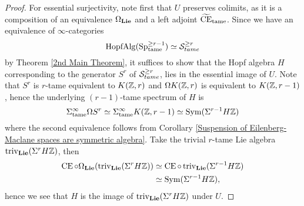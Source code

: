 \begin{proof}

	
	

    For essential surjectivity, note first that  $U$ preserves colimits, as it is a composition of an equivalence $\Omega_{\mathbf{Lie}}$ and a left adjoint $\widetilde{\operatorname{CE}}_{\operatorname{\operatorname{tame}}}$. 
    Since we have an equivalence of $\infty$-categories 
    $$\operatorname{HopfAlg}(\operatorname{Sp}^{\geq r-1}_{\operatorname{\operatorname{tame}}})
    \simeq
    {\mathcal{S}}^{\geq r}_{tame}
    $$  by Theorem \ref{2nd Main Theorem},
    it suffices to show that the Hopf algebra $H$ corresponding to the generator $S^r$ of ${\mathcal{S}}^{\geq r}_{tame}$, lies in the essential image of $U$. 
    Note that $S^{r}$ is $r$-tame equivalent to $K({\mathbb{Z}}, r)$ and $\Omega K({\mathbb{Z}}, r)$ is  equivalent to $K({\mathbb{Z}}, r-1)$, hence the underlying $(r-1)$-tame spectrum of $H$ is 
    $$
    \Sigma^{\infty}_{\operatorname{tame}}\Omega S^{r}
    \simeq 
    \Sigma^{\infty}_{\operatorname{tame}} K({\mathbb{Z}}, r-1)
    \simeq \operatorname{Sym}(\Sigma^{r-1}H{\mathbb{Z}})
    $$ 
    where the second equivalence follows from Corollary \ref{Suspension of Eilenberg-Maclane spaces are symmetric algebra}.
    Take the trivial $r$-tame Lie algebra $\operatorname{triv}_{\mathbf{Lie}}(\Sigma^{r}H{\mathbb{Z}})$, then
    \begin{align*}
        \operatorname{CE}\circ  \Omega_{\mathbf{Lie}}(\operatorname{triv}_{\mathbf{Lie}}(\Sigma^{r}H{\mathbb{Z}}))
        & \simeq 
        \operatorname{CE}\circ \operatorname{triv}_{\mathbf{Lie}} (\Sigma^{r-1}H{\mathbb{Z}})\\
        & \simeq \operatorname{Sym}(\Sigma^{r-1}H{\mathbb{Z}}),
    \end{align*}
    hence we see that $H$ is the image of $\operatorname{triv}_{\mathbf{Lie}}(\Sigma^{r}H{\mathbb{Z}})$ under $U$.
    
\end{proof}

